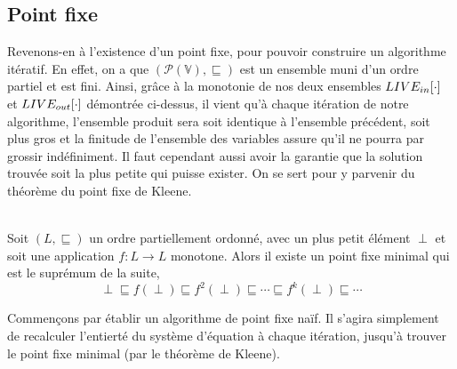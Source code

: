 \documentclass[a4paper, 12pt]{article}
\begin{document}
\subsection{Point fixe}
Revenons-en à l'existence d'un point fixe, pour pouvoir construire un algorithme itératif. En effet,
on a que $(\mathcal{P}(\mathbb{V}), \sqsubseteq)$ est un ensemble muni d'un ordre partiel et est fini.
Ainsi, grâce à la monotonie de nos deux ensembles $LIVE_{in}[\cdot]$ et $LIVE_{out}[\cdot]$ démontrée ci-dessus, il
vient qu'à chaque itération de notre algorithme, l'ensemble produit sera soit identique à l'ensemble précédent,
soit plus gros et la finitude de l'ensemble des variables assure qu'il ne pourra par grossir indéfiniment. 
Il faut cependant aussi avoir la garantie que la solution trouvée soit la plus petite qui puisse exister.
On se sert pour y parvenir du théorème du point fixe de Kleene.
\\
\\
\begin{theorem}	
	Soit $(L, \sqsubseteq)$ un ordre partiellement ordonné, avec un plus petit élément  $\perp$ et soit
	une application $f : L \longrightarrow L$ monotone. Alors il existe un point fixe minimal qui est le suprémum de la suite,
	\[\perp \sqsubseteq f(\perp) \sqsubseteq f^2(\perp) \sqsubseteq \cdots \sqsubseteq f^k(\perp) \sqsubseteq \cdots\]
\end{theorem}

Commençons par établir un algorithme de point fixe naïf. Il s'agira simplement de recalculer l'entierté du système
d'équation à chaque itération, jusqu'à trouver le point fixe minimal (par le théorème de Kleene).
\end{document}
